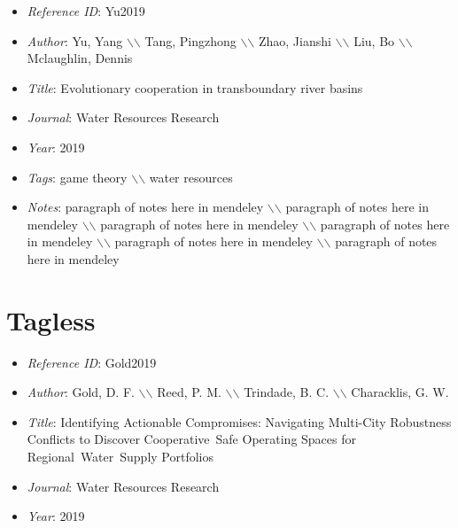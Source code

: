\documentclass[11pt]{article}
\begin{document}
\noindent\citep{Yu2019} 
\begin{itemize} 
\item{\textit{Reference ID}:  Yu2019} 

\item{\textit{Author}:  Yu, Yang $\backslash$$\backslash$ Tang, Pingzhong $\backslash$$\backslash$ Zhao, Jianshi $\backslash$$\backslash$ Liu, Bo $\backslash$$\backslash$ Mclaughlin, Dennis} 

\item{\textit{Title}:  Evolutionary cooperation in transboundary river basins} 

\item{\textit{Journal}:  Water Resources Research} 

\item{\textit{Year}:  2019} 

\item{\textit{Tags}:  game theory $\backslash$$\backslash$ water resources} 

\item{\textit{Notes}:  paragraph of notes here in mendeley $\backslash$$\backslash$ paragraph of notes here in mendeley $\backslash$$\backslash$ paragraph of notes here in mendeley $\backslash$$\backslash$ paragraph of notes here in mendeley $\backslash$$\backslash$ paragraph of notes here in mendeley $\backslash$$\backslash$ paragraph of notes here in mendeley} 

\end{itemize}\medskip



\section{Tagless} 
\noindent\citep{Gold2019} 
\begin{itemize} 
\item{\textit{Reference ID}:  Gold2019} 

\item{\textit{Author}:  Gold, D. F. $\backslash$$\backslash$ Reed, P. M. $\backslash$$\backslash$ Trindade, B. C. $\backslash$$\backslash$ Characklis, G. W.} 

\item{\textit{Title}:  Identifying Actionable Compromises: Navigating Multi-City Robustness Conflicts to Discover Cooperative Safe Operating Spaces for Regional Water Supply Portfolios} 

\item{\textit{Journal}:  Water Resources Research} 

\item{\textit{Year}:  2019} 

\end{itemize}\medskip
\end{document}
